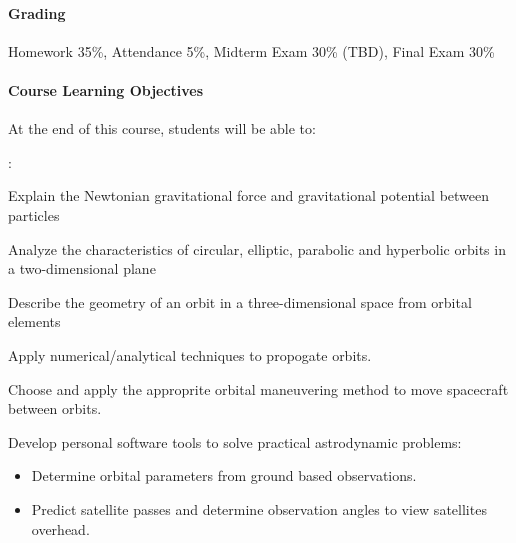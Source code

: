 \documentclass[10pt]{article}
\begin{document}
\paragraph*{Grading}
Homework 35\%,\;\; Attendance 5\%,\;\; Midterm Exam 30\% (TBD),\;\; Final Exam 30\%


\paragraph*{Course Learning Objectives}
At the end of this course, students will be able to:

\begin{list}
{:}
{\setlength{\itemsep}{-3pt}}
\item Explain the Newtonian gravitational force and gravitational potential between particles
\item Analyze the characteristics of circular, elliptic, parabolic and hyperbolic orbits in a two-dimensional plane
\item Describe the geometry of an orbit in a three-dimensional space from orbital elements
\item Apply numerical/analytical techniques to propogate orbits.
\item Choose and apply the approprite orbital maneuvering method to move spacecraft between orbits.
\item Develop personal software tools to solve practical astrodynamic problems:
    \begin{itemize}
        \item Determine orbital parameters from ground based observations.
        \item Predict satellite passes and determine observation angles to view satellites overhead.
    \end{itemize}
\end{list}
\end{document}
